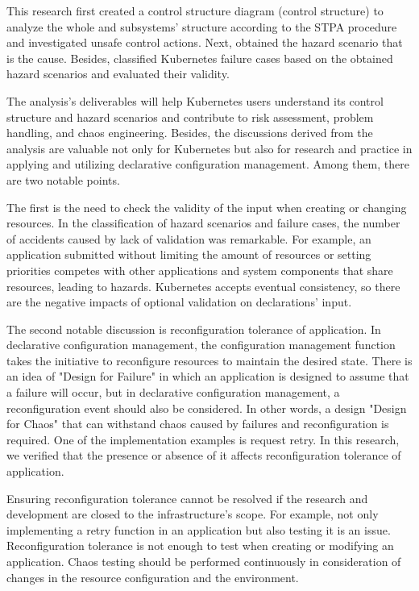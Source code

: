 \documentclass[12pt,a4j]{ujreport}
\begin{document}
This research first created a control structure diagram (control structure) to analyze the whole and subsystems' structure according to the STPA procedure and investigated unsafe control actions. Next, obtained the hazard scenario that is the cause. Besides, classified Kubernetes failure cases based on the obtained hazard scenarios and evaluated their validity.

The analysis's deliverables will help Kubernetes users understand its control structure and hazard scenarios and contribute to risk assessment, problem handling, and chaos engineering. Besides, the discussions derived from the analysis are valuable not only for Kubernetes but also for research and practice in applying and utilizing declarative configuration management. Among them, there are two notable points.

The first is the need to check the validity of the input when creating or changing resources. In the classification of hazard scenarios and failure cases, the number of accidents caused by lack of validation was remarkable. For example, an application submitted without limiting the amount of resources or setting priorities competes with other applications and system components that share resources, leading to hazards. Kubernetes accepts eventual consistency, so there are the negative impacts of optional validation on declarations' input.

The second notable discussion is reconfiguration tolerance of application. In declarative configuration management, the configuration management function takes the initiative to reconfigure resources to maintain the desired state. There is an idea of "Design for Failure" in which an application is designed to assume that a failure will occur, but in declarative configuration management, a reconfiguration event should also be considered. In other words, a design "Design for Chaos" that can withstand chaos caused by failures and reconfiguration is required. One of the implementation examples is request retry. In this research, we verified that the presence or absence of it affects reconfiguration tolerance of application.

Ensuring reconfiguration tolerance cannot be resolved if the research and development are closed to the infrastructure's scope. For example, not only implementing a retry function in an application but also testing it is an issue. Reconfiguration tolerance is not enough to test when creating or modifying an application. Chaos testing should be performed continuously in consideration of changes in the resource configuration and the environment.
\end{document}
